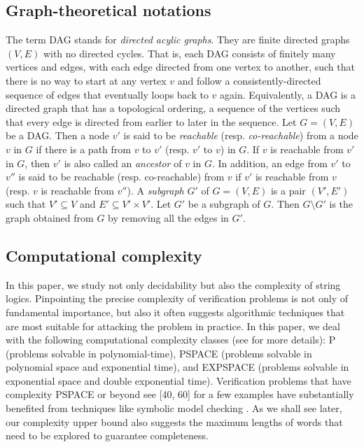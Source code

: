 \subsection*{Graph-theoretical notations}
The term DAG stands for \emph{directed acylic graphs}. They are finite directed graphs $(V, E)$ with no directed cycles. That is, each DAG consists of finitely many vertices and edges, with each edge directed from one vertex to another, such that there is no way to start at any vertex $v$ and follow a consistently-directed sequence of edges that eventually loops back to $v$ again. Equivalently, a DAG is a directed graph that has a topological ordering, a sequence of the vertices such that every edge is directed from earlier to later in the sequence. Let $G=(V,E)$ be a DAG. Then a node $v'$ is said to be \emph{reachable} (resp. \emph{co-reachable}) from a node $v$ in $G$ if there is a path from $v$ to $v'$ (resp. $v'$ to $v$) in $G$. If $v$ is reachable from $v'$ in $G$, then $v'$ is also called an \emph{ancestor} of $v$ in $G$. In addition, an edge from $v'$ to $v''$ is said to be reachable (resp. co-reachable) from $v$ if $v'$ is reachable from $v$ (resp. $v$ is reachable from $v''$).  A \emph{subgraph} $G'$ of $G=(V,E)$ is a pair $(V', E')$ such that $V' \subseteq V$ and $E' \subseteq V' \times V'$. Let $G'$ be a subgraph of $G$. Then $G \setminus G'$ is the graph obtained from $G$ by removing all the edges in $G'$.



\subsection*{Computational complexity}
In this paper, we study not only decidability but also the complexity of string logics. Pinpointing the
precise complexity of verification problems is not only of fundamental
importance, but also it often suggests algorithmic techniques
that are most suitable for attacking the problem in practice.
In this paper, we deal with the following computational complexity
classes (see \cite{} for more details): P (problems solvable
in polynomial-time), PSPACE (problems solvable in polynomial
space and exponential time), and EXPSPACE (problems solvable
in exponential space and double exponential time). Verification
problems that have complexity PSPACE or beyond see [40, 60]
for a few examples have substantially benefited from techniques
like symbolic model checking \cite{}. As we shall see later, our complexity
upper bound also suggests the maximum lengths of words
that need to be explored to guarantee completeness.

